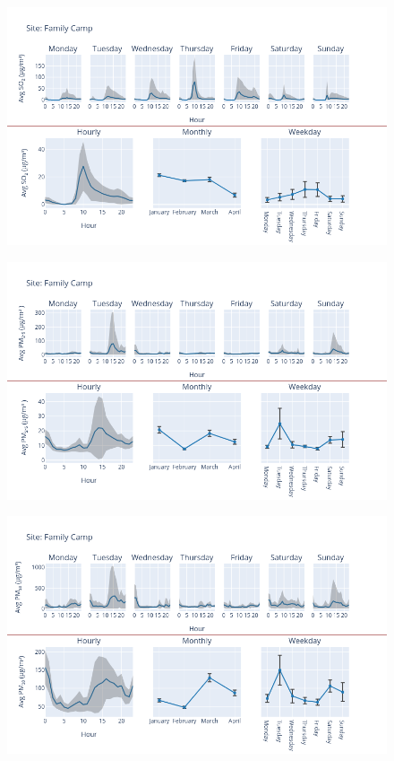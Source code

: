 \documentclass[12pt, oneside]{book}
\begin{document}
{ 
{\begin{figure}[H] 
 \centering 
\includegraphics[width=.88\textwidth, keepaspectratio]{image77} 
 \end{figure}}{} 

{\begin{figure}[H] 
 \centering 
\includegraphics[width=.88\textwidth, keepaspectratio]{image78} 
 \end{figure}}{} 

{\begin{figure}[H] 
 \centering 
\includegraphics[width=.88\textwidth, keepaspectratio]{image79} 
 \end{figure}}{} 

}
\end{document}
